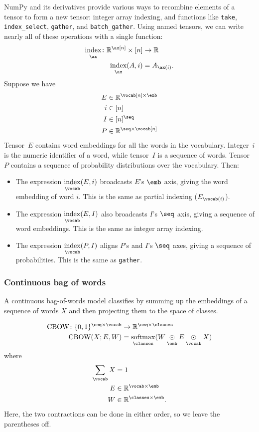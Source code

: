 \documentclass{article}
\newcommand{\reals}{\mathbb{R}}
\begin{document}
NumPy and its derivatives provide various ways to recombine elements of a tensor to form a new tensor: integer array indexing, and functions like \verb|take|, \verb|index_select|, \verb|gather|, and \verb|batch_gather|. Using named tensors, we can write nearly all of these operations with a single function:
\begin{align*}
  \nfun{\ax}{index} \colon \reals^{\ax[n]} \times [n] &\rightarrow \reals \\
  \nfun{\ax}{index}(A, i) &= A_{\ax(i)}.
\end{align*}
Suppose we have
\begin{align*}
  E &\in \reals^{\vocab[n] \times \emb} \\
  i &\in [n] \\
  I &\in [n]^{\seq} \\
  P &\in \reals^{\seq \times \vocab[n]}
\end{align*}
Tensor~$E$ contains word embeddings for all the words in the vocabulary. Integer~$i$ is the numeric identifier of a word, while tensor~$I$ is a sequence of words. Tensor~$P$ contains a sequence of probability distributions over the vocabulary. Then:
\begin{itemize}
\item The expression $\nfun{\vocab}{index}(E,i)$ broadcasts $E$'s $\emb$ axis, giving the word embedding of word $i$. This is the same as partial indexing ($E_{\vocab(i)}$).
\item The expression $\nfun{\vocab}{index}(E,I)$ also broadcasts $I$'s $\seq$ axis, giving a sequence of word embeddings. This is the same as integer array indexing.
\item The expression $\nfun{\vocab}{index}(P,I)$ aligns $P$'s and $I$'s $\seq$ axes, giving a sequence of probabilities. This is the same as \verb|gather|.
\end{itemize}

\subsubsection{Continuous bag of words}

A continuous bag-of-words model classifies by summing up the embeddings of a sequence of words $X$ and then projecting them to the space of classes. 

\begin{align*}
\text{CBOW} \colon \{0, 1\}^{\seq \times \vocab} &\rightarrow \reals^{\seq \times \classes} \\
\text{CBOW}(X; E, W) &= \nfun{\classes}{softmax} (W \ndot{\emb} E \ndot{\vocab} X)
\end{align*}
where
\begin{align*}
\nsum{\vocab} X &= 1 \\
E &\in \reals^{\vocab \times \emb} \\
W &\in \reals^{\classes \times \emb}.
\end{align*}
Here, the two contractions can be done in either order, so we leave the parentheses off.
\end{document}
